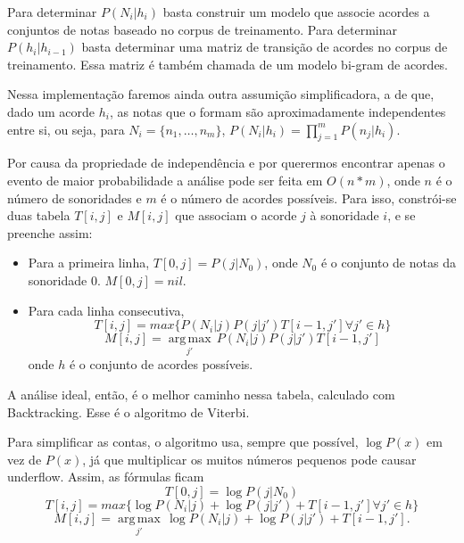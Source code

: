 \documentclass{article}
\begin{document}
Para determinar $P(N_i|h_i)$ basta construir um modelo que associe
acordes a conjuntos de notas baseado no corpus de treinamento. Para
determinar $P(h_i|h_{i-1})$ basta determinar uma matriz de transição
de acordes no corpus de treinamento. Essa matriz é também chamada de
um modelo bi-gram de acordes.

Nessa implementação faremos ainda outra assumição simplificadora, a de
que, dado um acorde $h_i$, as notas que o formam são aproximadamente
independentes entre si, ou seja, para $N_i = \{n_1, \ldots , n_m\}$,
$P(N_i|h_i) = \prod_{j=1}^m P(n_j|h_i)$.

Por causa da propriedade de independência e por querermos encontrar
apenas o evento de maior probabilidade a análise pode ser feita em
$O(n*m)$, onde $n$ é o número de sonoridades e $m$ é o número de
acordes possíveis. Para isso, constrói-se duas tabela $T[i,j]$ e
$M[i,j]$ que associam o acorde $j$ à sonoridade $i$, e se preenche
assim:
\begin{itemize}
\item Para a primeira linha, $T[0,j] = P(j|N_0)$, onde $N_0$ é
  o conjunto de notas da sonoridade $0$. $M[0,j] = nil$.
\item Para cada linha consecutiva, 
\[ T[i,j] = max \{ P(N_i|j)P(j|j')T[i-1,j'] \forall j' \in h \} \] 
\[ M[i,j] = \underset{j'}{\operatorname{arg\,max}}\,  P(N_i|j)P(j|j')T[i-1,j']  \]
onde $h$ é o conjunto de acordes possíveis.
\end{itemize}
A análise ideal, então, é o melhor caminho nessa tabela, calculado com
Backtracking. Esse é o algoritmo de Viterbi.

Para simplificar as contas, o algoritmo usa, sempre que possível,
$\log P(x)$ em vez de $P(x)$, já que multiplicar os muitos números
pequenos pode causar underflow. Assim, as fórmulas ficam
\[ T[0,j] = \log P(j|N_0)\]
\[ T[i,j] = max \{ \log P(N_i|j) + \log P(j|j') + T[i-1,j'] \forall j' \in h \} \] 
\[ M[i,j] = \underset{j'}{\operatorname{arg\,max}}\,  \log P(N_i|j) + \log P(j|j') + T[i-1,j'].\]
\end{document}
